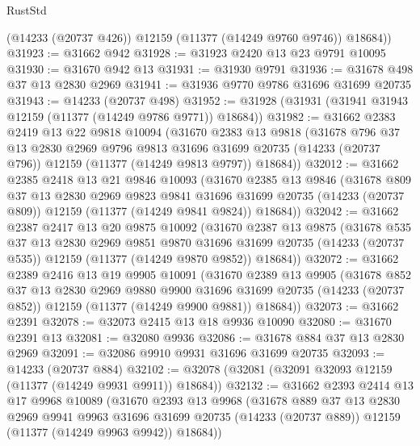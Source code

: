\begin{lexlean}{RustStd}
\begin{coremodule}
        (@14233 (@20737 @426))
        @12159
        (@11377 (@14249 @9760 @9746))
        @18684))
@31923 := @31662 @942
@31928 := @31923 @2420 @13 @23 @9791 @10095
@31930 := @31670 @942 @13
@31931 := @31930 @9791
@31936 := @31678 @498 @37 @13 @2830 @2969
@31941 := @31936 @9770 @9786 @31696 @31699 @20735
@31943 := @14233 (@20737 @498)
@31952 := @31928 (@31931 (@31941 @31943 @12159 (@11377 (@14249 @9786 @9771)) @18684))
@31982 := @31662
    @2383
    @2419
    @13
    @22
    @9818
    @10094
    (@31670
      @2383
      @13
      @9818
      (@31678
        @796
        @37
        @13
        @2830
        @2969
        @9796
        @9813
        @31696
        @31699
        @20735
        (@14233 (@20737 @796))
        @12159
        (@11377 (@14249 @9813 @9797))
        @18684))
@32012 := @31662
    @2385
    @2418
    @13
    @21
    @9846
    @10093
    (@31670
      @2385
      @13
      @9846
      (@31678
        @809
        @37
        @13
        @2830
        @2969
        @9823
        @9841
        @31696
        @31699
        @20735
        (@14233 (@20737 @809))
        @12159
        (@11377 (@14249 @9841 @9824))
        @18684))
@32042 := @31662
    @2387
    @2417
    @13
    @20
    @9875
    @10092
    (@31670
      @2387
      @13
      @9875
      (@31678
        @535
        @37
        @13
        @2830
        @2969
        @9851
        @9870
        @31696
        @31699
        @20735
        (@14233 (@20737 @535))
        @12159
        (@11377 (@14249 @9870 @9852))
        @18684))
@32072 := @31662
    @2389
    @2416
    @13
    @19
    @9905
    @10091
    (@31670
      @2389
      @13
      @9905
      (@31678
        @852
        @37
        @13
        @2830
        @2969
        @9880
        @9900
        @31696
        @31699
        @20735
        (@14233 (@20737 @852))
        @12159
        (@11377 (@14249 @9900 @9881))
        @18684))
@32073 := @31662 @2391
@32078 := @32073 @2415 @13 @18 @9936 @10090
@32080 := @31670 @2391 @13
@32081 := @32080 @9936
@32086 := @31678 @884 @37 @13 @2830 @2969
@32091 := @32086 @9910 @9931 @31696 @31699 @20735
@32093 := @14233 (@20737 @884)
@32102 := @32078 (@32081 (@32091 @32093 @12159 (@11377 (@14249 @9931 @9911)) @18684))
@32132 := @31662
    @2393
    @2414
    @13
    @17
    @9968
    @10089
    (@31670
      @2393
      @13
      @9968
      (@31678
        @889
        @37
        @13
        @2830
        @2969
        @9941
        @9963
        @31696
        @31699
        @20735
        (@14233 (@20737 @889))
        @12159
        (@11377 (@14249 @9963 @9942))
        @18684))

\end{coremodule}
\end{lexlean}
